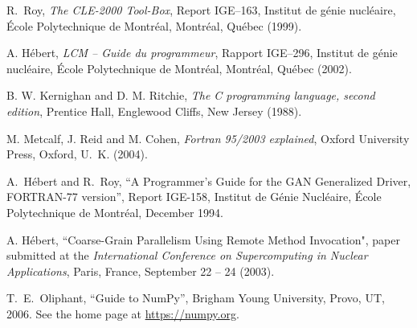 \begin{thebibliography}{99}

R.~Roy,  \textsl{The CLE-2000 Tool-Box}, 
Report IGE--163, Institut de g\'enie nucl\'eaire, \'{E}cole Polytechnique de Montr\'eal,
Montr\'{e}al, Qu\'{e}bec (1999).

A. H\'ebert, \textsl{LCM -- Guide du programmeur}, 
Rapport IGE--296, Institut de g\'enie nucl\'eaire, \'{E}cole Polytechnique de Montr\'eal,
Montr\'{e}al, Qu\'{e}bec (2002).

B. W. Kernighan and D. M. Ritchie, \textsl{The C programming language, second edition},
Prentice Hall, Englewood Cliffs, New Jersey (1988).

M. Metcalf, J. Reid and M. Cohen, \textsl{Fortran 95/2003 explained},
Oxford University Press, Oxford, U.~K. (2004).

A.~H\'ebert and R.~Roy, ``A Programmer's Guide for the GAN Generalized Driver, FORTRAN-77 version'', Report IGE-158, Institut de G\'enie Nucl\'eaire, \'Ecole Polytechnique de Montr\'eal, December 1994.

A. H\'ebert, ``Coarse-Grain Parallelism Using Remote Method Invocation", paper submitted at the {\sl International Conference on Supercomputing in Nuclear Applications},
Paris, France, September 22 -- 24 (2003).

T.~E.~Oliphant, ``Guide to NumPy'', Brigham Young University, Provo, UT, 2006. See the home page at \url{https://numpy.org}.

\end{thebibliography}
